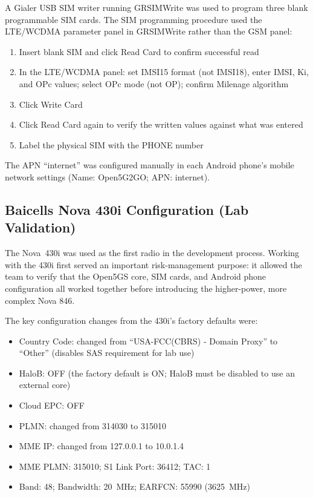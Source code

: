 \documentclass[
    left=1.5in,
    right=1.25in,
    top=1.25in,
    bottom=1.25in
]{CalPolySeniorProject}
\begin{document}
A Gialer USB SIM writer running GRSIMWrite was used to program three blank
programmable SIM cards. The SIM programming procedure used the LTE/WCDMA
parameter panel in GRSIMWrite rather than the GSM panel:

\begin{enumerate}
    \item Insert blank SIM and click Read Card to confirm successful read
    \item In the LTE/WCDMA panel: set IMSI15 format (not IMSI18), enter IMSI,
    Ki, and OPc values; select OPc mode (not OP); confirm Milenage algorithm
    \item Click Write Card
    \item Click Read Card again to verify the written values against what was
    entered
    \item Label the physical SIM with the PHONE number
\end{enumerate}

The APN ``internet'' was configured manually in each Android phone's mobile
network settings (Name: Open5G2GO; APN: internet).

\subsection{Baicells Nova 430i Configuration (Lab Validation)}

The Nova~430i was used as the first radio in the development process. Working
with the 430i first served an important risk-management purpose: it allowed the
team to verify that the Open5GS core, SIM cards, and Android phone configuration
all worked together before introducing the higher-power, more complex Nova 846.

The key configuration changes from the 430i's factory defaults were:

\begin{itemize}
    \item Country Code: changed from ``USA-FCC(CBRS) - Domain Proxy'' to
    ``Other'' (disables SAS requirement for lab use)
    \item HaloB: OFF (the factory default is ON; HaloB must be disabled to use
    an external core)
    \item Cloud EPC: OFF
    \item PLMN: changed from 314030 to 315010
    \item MME IP: changed from 127.0.0.1 to 10.0.1.4
    \item MME PLMN: 315010; S1 Link Port: 36412; TAC: 1
    \item Band: 48; Bandwidth: 20~MHz; EARFCN: 55990 (3625~MHz)
\end{itemize}
\end{document}
